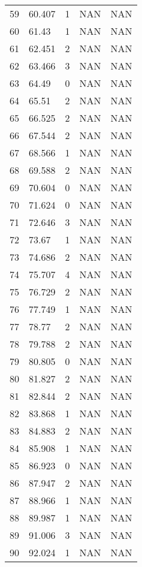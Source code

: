 \documentclass{article}
\begin{document}
\begin{longtable}{@{}lllll@{}}
				59  & 60.407  & 1    & NAN  & NAN  \\
				60  & 61.43   & 1    & NAN  & NAN  \\
				61  & 62.451  & 2    & NAN  & NAN  \\
				62  & 63.466  & 3    & NAN  & NAN  \\
				63  & 64.49   & 0    & NAN  & NAN  \\
				64  & 65.51   & 2    & NAN  & NAN  \\
				65  & 66.525  & 2    & NAN  & NAN  \\
				66  & 67.544  & 2    & NAN  & NAN  \\
				67  & 68.566  & 1    & NAN  & NAN  \\
				68  & 69.588  & 2    & NAN  & NAN  \\
				69  & 70.604  & 0    & NAN  & NAN  \\
				70  & 71.624  & 0    & NAN  & NAN  \\
				71  & 72.646  & 3    & NAN  & NAN  \\
				72  & 73.67   & 1    & NAN  & NAN  \\
				73  & 74.686  & 2    & NAN  & NAN  \\
				74  & 75.707  & 4    & NAN  & NAN  \\
				75  & 76.729  & 2    & NAN  & NAN  \\
				76  & 77.749  & 1    & NAN  & NAN  \\
				77  & 78.77   & 2    & NAN  & NAN  \\
				78  & 79.788  & 2    & NAN  & NAN  \\
				79  & 80.805  & 0    & NAN  & NAN  \\
				80  & 81.827  & 2    & NAN  & NAN  \\
				81  & 82.844  & 2    & NAN  & NAN  \\
				82  & 83.868  & 1    & NAN  & NAN  \\
				83  & 84.883  & 2    & NAN  & NAN  \\
				84  & 85.908  & 1    & NAN  & NAN  \\
				85  & 86.923  & 0    & NAN  & NAN  \\
				86  & 87.947  & 2    & NAN  & NAN  \\
				87  & 88.966  & 1    & NAN  & NAN  \\
				88  & 89.987  & 1    & NAN  & NAN  \\
				89  & 91.006  & 3    & NAN  & NAN  \\
				90  & 92.024  & 1    & NAN  & NAN  \\

\end{longtable}
\end{document}
